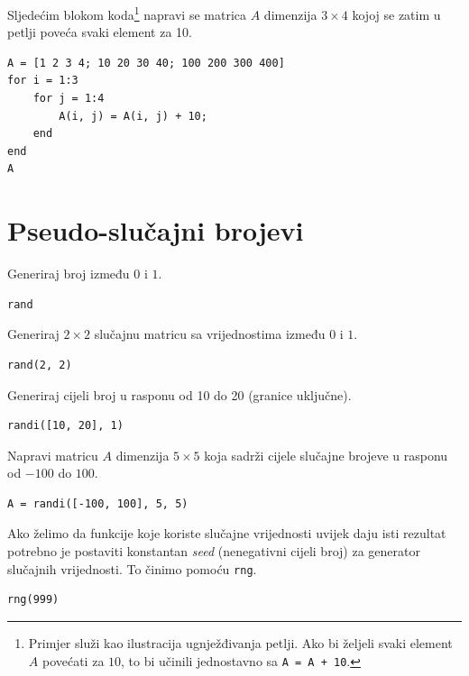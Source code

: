 \documentclass[a4paper, 10pt]{article}
\begin{document}
Sljedećim blokom koda\footnote{Primjer služi kao ilustracija ugnježđivanja petlji.
Ako bi željeli svaki element $A$ povećati za $10$, to bi učinili jednostavno sa \texttt{A = A + 10}.}
napravi se matrica $A$ dimenzija $3 \times 4$ kojoj se zatim u petlji poveća svaki element za 10.

\begin{lstlisting}
A = [1 2 3 4; 10 20 30 40; 100 200 300 400]
for i = 1:3
    for j = 1:4
        A(i, j) = A(i, j) + 10;
    end
end
A
\end{lstlisting}


\section{Pseudo-slučajni brojevi}

Generiraj broj između $0$ i $1$.

\begin{lstlisting}
rand
\end{lstlisting}

Generiraj $2 \times 2$ slučajnu matricu sa vrijednostima između $0$ i $1$. 

\begin{lstlisting}
rand(2, 2)
\end{lstlisting}

Generiraj cijeli broj u rasponu od 10 do 20 (granice uključne).

\begin{lstlisting}
randi([10, 20], 1)
\end{lstlisting}

Napravi matricu $A$ dimenzija $5 \times 5$ koja sadrži cijele slučajne brojeve u rasponu od $-100$ do $100$.

\begin{lstlisting}
A = randi([-100, 100], 5, 5)
\end{lstlisting}

Ako želimo da funkcije koje koriste slučajne vrijednosti uvijek daju isti rezultat potrebno je postaviti konstantan \emph{seed} (nenegativni cijeli broj) za generator slučajnih vrijednosti. To činimo pomoću \texttt{rng}.

\begin{lstlisting}
rng(999)
\end{lstlisting}
\end{document}
